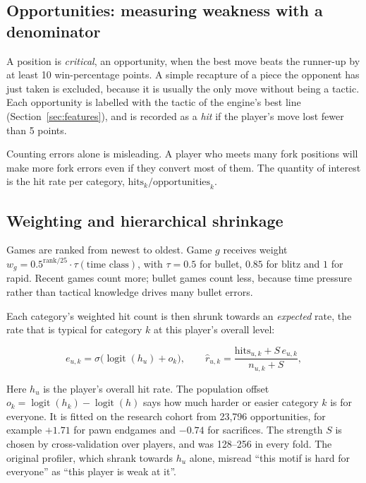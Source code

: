 \subsection{Opportunities: measuring weakness with a denominator}

A position is \emph{critical}, an opportunity, when the best move beats the runner-up by at least 10
win-percentage points. A simple recapture of a piece the opponent has just taken is excluded, because
it is usually the only move without being a tactic. Each opportunity is labelled with the tactic of
the engine's best line (Section~\ref{sec:features}), and is recorded as a \emph{hit} if the player's
move lost fewer than 5 points.

Counting errors alone is misleading. A player who meets many fork positions will make more fork
errors even if they convert most of them. The quantity of interest is the hit rate per category,
$\text{hits}_k / \text{opportunities}_k$.

\subsection{Weighting and hierarchical shrinkage}

Games are ranked from newest to oldest. Game $g$ receives weight $w_g = 0.5^{\text{rank}/25} \cdot
\tau(\text{time class})$, with $\tau = 0.5$ for bullet, $0.85$ for blitz and $1$ for rapid. Recent
games count more; bullet games count less, because time pressure rather than tactical knowledge drives
many bullet errors.

Each category's weighted hit count is then shrunk towards an \emph{expected} rate, the rate that is
typical for category $k$ at this player's overall level:

\begin{equation}
  e_{u,k} = \sigma\!\bigl(\operatorname{logit}(h_u) + o_k\bigr), \qquad
  \hat r_{u,k} = \frac{\text{hits}_{u,k} + S\,e_{u,k}}{n_{u,k} + S},
\end{equation}

\noindent Here $h_u$ is the player's overall hit rate. The population offset $o_k =
\operatorname{logit}(h_k) - \operatorname{logit}(h)$ says how much harder or easier category $k$ is
for everyone. It is fitted on the research cohort from 23,796 opportunities, for example $+1.71$ for
pawn endgames and $-0.74$ for sacrifices. The strength $S$ is chosen by cross-validation over
players, and was 128--256 in every fold. The original profiler, which shrank towards $h_u$ alone,
misread ``this motif is hard for everyone'' as ``this player is weak at it''.

